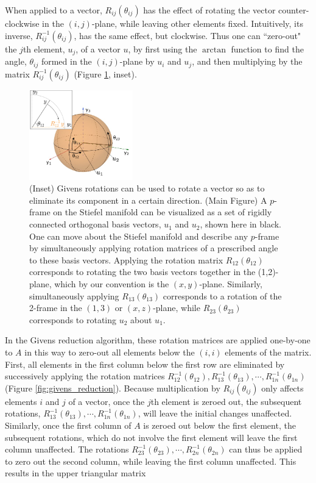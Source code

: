 \documentclass[ba]{imsart}
\numberwithin{equation}{section}
\theoremstyle{plain}
\begin{document}
\noindent When applied to a vector, $R_{ij}(\theta_{ij})$ has the effect of rotating the vector counter-clockwise in the $(i,j)$-plane, while leaving other elements fixed. Intuitively, its inverse, $R_{ij}^{-1}(\theta_{ij})$, has the same effect, but clockwise. Thus one can ``zero-out" the $j$th element, $u_j$, of a vector $u$, by first using the $\arctan$ function to find the angle, $\theta_{ij}$ formed in the $(i,j)$-plane by $u_i$ and $u_j$, and then multiplying by the matrix $R_{ij}^{-1}(\theta_{ij})$ (Figure \ref{fig:StiefelGeom}, inset).

\begin{figure}[h]
\centering
\vspace{.1in}
\includegraphics[width=0.4\textwidth]{figures/stiefel_geom_new.png}
\vspace{.05in}
\caption{(Inset) Givens rotations can be used to rotate a vector so as to eliminate its component in a certain direction. (Main Figure) A $p$-frame on the Stiefel manifold can be visualized as a set of rigidly connected orthogonal basis vectors, $u_1$ and $u_2$, shown here in black. One can move about the Stiefel manifold and describe any $p$-frame by simultaneously applying rotation matrices of a prescribed angle to these basis vectors. Applying the rotation matrix $R_{12}(\theta_{12})$ corresponds to rotating the two basis vectors together in the (1,2)-plane, which by our convention is the $(x,y)$-plane. Similarly, simultaneously applying $R_{13}(\theta_{13})$ corresponds to a rotation of the 2-frame in the $(1,3)$ or $(x,z)$-plane, while $R_{23}(\theta_{23})$ corresponds to rotating $u_2$ about $u_1$.}
\label{fig:StiefelGeom}
\end{figure}

\noindent In the Givens reduction algorithm, these rotation matrices are applied one-by-one to $A$ in this way to zero-out all elements below the $(i,i)$ elements of the matrix. First, all elements in the first column below the first row are eliminated by successively applying the rotation matrices $R_{12}^{-1}(\theta_{12}), R_{13}^{-1}(\theta_{13}), \cdots, R_{1n}^{-1}(\theta_{1n})$  (Figure \ref{fig:givens_reduction}). Because multiplication by $R_{ij}(\theta_{ij})$ only affects elements $i$ and $j$ of a vector, once the $j$th element is zeroed out, the subsequent rotations, $R_{13}^{-1}(\theta_{13}), \cdots, R_{1n}^{-1}(\theta_{1n})$, will leave the initial changes unaffected. Similarly, once the first column of $A$ is zeroed out below the first element, the subsequent rotations, which do not involve the first element will leave the first column unaffected. The rotations  $R_{23}^{-1}(\theta_{23}), \cdots, R_{2n}^{-1}(\theta_{2n})$ can thus be applied to zero out the second column, while leaving the first column unaffected. This results in the upper triangular matrix
\end{document}
